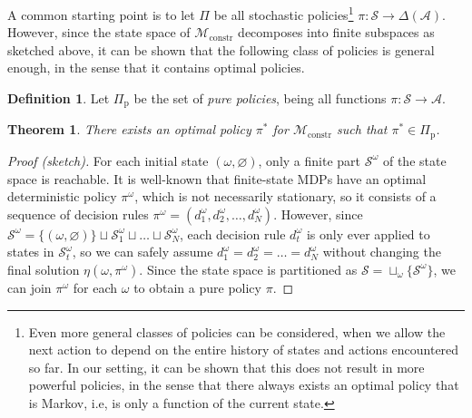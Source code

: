 \documentclass[a4paper]{report}
\theoremstyle{definition}
\newtheorem{define}{Definition}[chapter]
\theoremstyle{plain}
\newtheorem{theorem}{Theorem}[chapter]
\begin{document}

A common starting point is to let $\Pi$ be all stochastic policies\footnote{Even
  more general classes of policies can be considered, when we allow the next
  action to depend on the entire history of states and actions encountered so
  far. In our setting, it can be shown that this does not result in more
  powerful policies, in the sense that there always exists an optimal policy
  that is Markov, i.e, is only a function of the current state.}
$\pi : \mathcal{S} \rightarrow \Delta(\mathcal{A})$. However, since the state
space of $\mathcal{M}_\mathrm{constr}$ decomposes into finite subspaces as
sketched above, it can be shown that the following class of policies is general
enough, in the sense that it contains optimal policies.

\begin{define}
  Let $\Pi_\mathrm{p}$ be the set of \emph{pure policies}, being all functions
  $\pi : \mathcal{S} \rightarrow \mathcal{A}$.
\end{define}

\begin{theorem}
  There exists an optimal policy $\pi^*$ for $\mathcal{M}_\mathrm{constr}$ such
  that $\pi^* \in \Pi_\mathrm{p}$.
\end{theorem}
\begin{proof}[Proof (sketch)]
  For each initial state $(\omega, \varnothing)$, only a finite part
  $\mathcal{S}^\omega$ of the state space is reachable.
  It is well-known that finite-state MDPs have an optimal deterministic policy
  $\pi^\omega$, which is not necessarily stationary, so it consists of a
  sequence of decision rules
  $\pi^\omega = (d^\omega_1, d^\omega_2, \dots, d^\omega_N)$.
  However, since
  $\mathcal{S}^\omega = \{(\omega, \varnothing)\} \sqcup \mathcal{S}_1^\omega \sqcup \dots \sqcup \mathcal{S}_N^\omega$,
  each decision rule $d_t^\omega$ is only ever applied to states in
  $\mathcal{S}_t^\omega$, so we can safely assume
  $d_1^\omega = d_2^\omega = \dots = d_N^\omega$ without changing the final
  solution $\eta(\omega, \pi^\omega)$.
  Since the state space is partitioned as
  $\mathcal{S} = \sqcup_\omega \{ \mathcal{S}^\omega \}$, we can join
  $\pi^\omega$ for each $\omega$ to obtain a pure policy $\pi$.
\end{proof}
\end{document}
